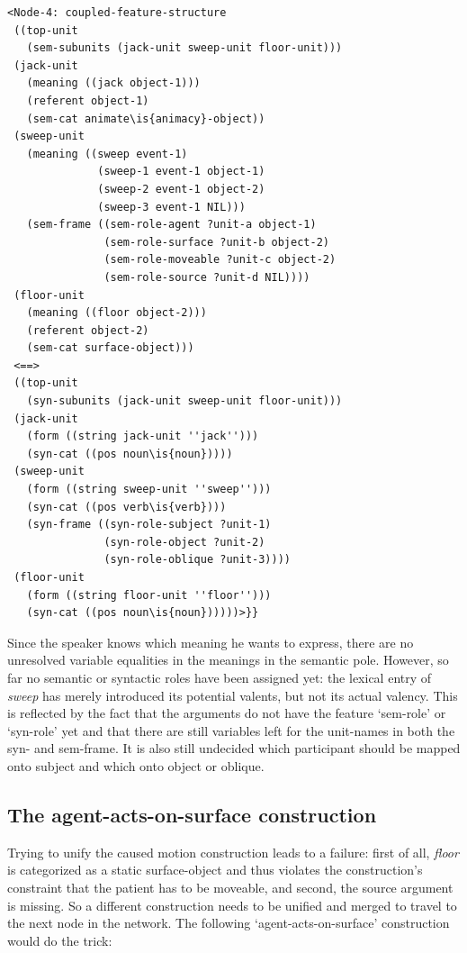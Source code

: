 \ea
\begin{lstlisting}
<Node-4: coupled-feature-structure
 ((top-unit
   (sem-subunits (jack-unit sweep-unit floor-unit)))
 (jack-unit
   (meaning ((jack object-1)))
   (referent object-1)
   (sem-cat animate\is{animacy}-object))
 (sweep-unit
   (meaning ((sweep event-1)
              (sweep-1 event-1 object-1)
              (sweep-2 event-1 object-2)
              (sweep-3 event-1 NIL)))
   (sem-frame ((sem-role-agent ?unit-a object-1)
               (sem-role-surface ?unit-b object-2)
               (sem-role-moveable ?unit-c object-2)
               (sem-role-source ?unit-d NIL))))
 (floor-unit
   (meaning ((floor object-2)))
   (referent object-2)
   (sem-cat surface-object)))
 <==>
 ((top-unit
   (syn-subunits (jack-unit sweep-unit floor-unit)))
 (jack-unit
   (form ((string jack-unit ''jack'')))
   (syn-cat ((pos noun\is{noun}))))
 (sweep-unit
   (form ((string sweep-unit ''sweep'')))
   (syn-cat ((pos verb\is{verb})))
   (syn-frame ((syn-role-subject ?unit-1)
               (syn-role-object ?unit-2)
               (syn-role-oblique ?unit-3))))
 (floor-unit
   (form ((string floor-unit ''floor'')))
   (syn-cat ((pos noun\is{noun})))))>}}

\end{lstlisting}
\z

Since the speaker knows which meaning he wants to express, there are no unresolved variable equalities in the meanings in the semantic pole. However, so far no semantic or syntactic roles have been assigned yet: the lexical entry of {\em sweep} has merely introduced its potential valents, but not its actual valency. This is reflected by the fact that the arguments do not have the feature `sem-role' or `syn-role' yet and that there are still variables left for the unit-names in both the syn- and sem-frame. It is also still undecided which participant should be mapped onto subject and which onto object or oblique.

\subsection{The agent-acts-on-surface construction}

\largerpage
Trying to unify the caused motion construction leads to a failure: first of all, {\em floor} is categorized as a static surface-object and thus violates the construction's constraint that the patient has to be moveable, and second, the source argument is missing. So a different construction needs to be unified and merged to travel to the next node in the network. The following `agent-acts-on-surface' construction would do the trick:

